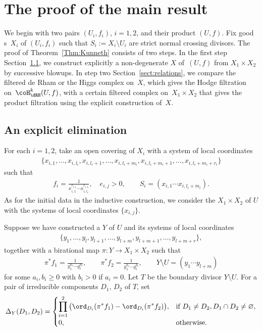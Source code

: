 \section{The proof of the main result}\label{sect:Resolution}

We begin with two pairs $(U_i,f_i)$, $i=1,2$, and their product $(U,f)$. Fix good {\cpt}s~$X_i$ of $(U_i,f_i)$ such that $S_i := X_i\setminus U_i$ are strict normal crossing divisors. The proof of Theorem~\ref{Thm:Kunneth} consists of two steps. In the first step Section~\ref{sect:elim}, we construct explicitly a non-degenerate {\cpt} $X$ of~$(U,f)$ from $X_1\times X_2$ by successive blowups. In step two Section~\ref{sect:relations}, we compare the filtered de Rham or the Higgs complex on~$X$, which gives the Hodge filtration on~$\coH_\dRH^k(U,f)$, with a certain filtered complex on~$X_1\times X_2$ that gives the product filtration using the explicit construction of~$X$.

\subsection{An explicit elimination}\label{sect:elim}

For each $i=1,2$, take an open covering of $X_i$ with a system of local coordinates
\begin{gather*} \{ x_{i,1},\dots, x_{i,l_i}, 	x_{i,l_i+1},\dots,x_{i,l_i+m_i}, 	x_{i,l_i+m_i+1},\dots,x_{i,l_i+m_i+r_i} \} \end{gather*}
such that
\begin{gather*} f_i = \frac{1}{x_{i,1}^{e_{i,1}}\cdots x_{i,l_i}^{e_{i,l_i}}}, \quad e_{i,j} > 0, \qquad S_i = (x_{i,1}\cdots x_{i,l_i+m_i}). \end{gather*}
As for the initial data in the inductive construction, we consider the {\cpt} $X_1\times X_2$ of $U$ with the systems of local coordinates $\{x_{i,j}\}$.

Suppose we have constructed a {\cpt} $Y$ of $U$ and its systems of local coordinates
\begin{gather}\label{eq:Y_LocCoor}
\{ y_1,\dots, y_l, y_{l+1}, \dots, y_{l+m},	y_{l+m+1}, \dots, y_{l+m+r} \},
\end{gather}
together with a birational map $\pi\colon Y \to X_1\times X_2$ such that
\begin{gather}\label{eq:Y_LocBeh}
\pi^*f_1 = \frac{1}{y_1^{a_1}\cdots y_l^{a_l}}, \qquad \pi^*f_2 = \frac{1}{y_1^{b_1}\cdots y_l^{b_l}}, \qquad Y\setminus U = (y_1\cdots y_{l+m})
\end{gather}
for some $a_i,b_i \geq 0$ with $b_i >0$ if $a_i = 0$. Let $T$ be the boundary divisor $Y\setminus U$. For a pair of irreducible components $D_1$, $D_2$ of $T$, set
\begin{gather*} \Delta_Y(D_1,D_2) = \begin{cases}
\displaystyle \prod_{i=1}^2\big(\ord_{D_i}(\pi^*f_1)-\ord_{D_i}(\pi^*f_2)\big), 	& \text{if $D_1\neq D_2, D_1\cap D_2 \neq \varnothing$}, \\
0, & \text{otherwise}. \end{cases}\end{gather*}

